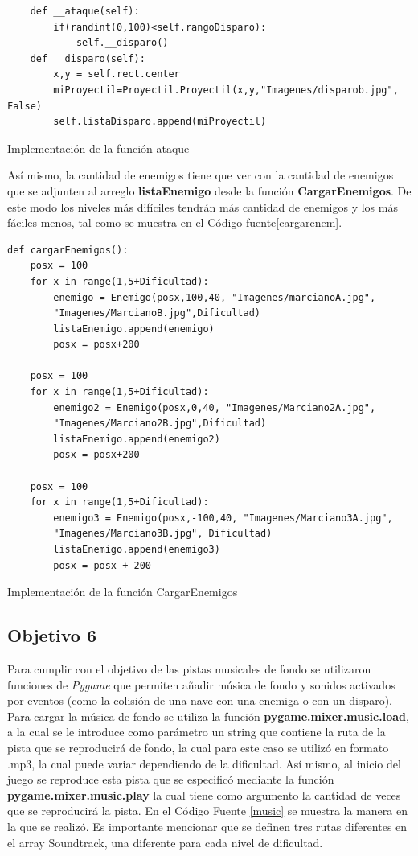 \documentclass[12pt,letterpaper]{article}
\begin{document}
\begin{listing}[H]
\begin{verbatim}
    def __ataque(self):
        if(randint(0,100)<self.rangoDisparo):
            self.__disparo()
    def __disparo(self):
        x,y = self.rect.center
        miProyectil=Proyectil.Proyectil(x,y,"Imagenes/disparob.jpg", False)
        self.listaDisparo.append(miProyectil)
\end{verbatim}
\caption{Implementación de la función ataque}
\label{ataque}
\end{listing}
Así mismo, la cantidad de enemigos tiene que ver con la cantidad de enemigos que se adjunten al arreglo \textbf{listaEnemigo} desde la función \textbf{CargarEnemigos}. De este modo los niveles más difíciles tendrán más cantidad de enemigos y los más fáciles menos, tal como se muestra en el Código fuente\ref{cargarenem}. 


        
    \begin{listing}[H]
\begin{verbatim}
def cargarEnemigos(): 
    posx = 100
    for x in range(1,5+Dificultad):
        enemigo = Enemigo(posx,100,40, "Imagenes/marcianoA.jpg",
        "Imagenes/MarcianoB.jpg",Dificultad)
        listaEnemigo.append(enemigo)
        posx = posx+200
    
    posx = 100
    for x in range(1,5+Dificultad):
        enemigo2 = Enemigo(posx,0,40, "Imagenes/Marciano2A.jpg",
        "Imagenes/Marciano2B.jpg",Dificultad)
        listaEnemigo.append(enemigo2)
        posx = posx+200

    posx = 100
    for x in range(1,5+Dificultad):
        enemigo3 = Enemigo(posx,-100,40, "Imagenes/Marciano3A.jpg",
        "Imagenes/Marciano3B.jpg", Dificultad)
        listaEnemigo.append(enemigo3)
        posx = posx + 200
\end{verbatim}
\caption{Implementación de la función CargarEnemigos}
\label{cargarenem}
\end{listing}
\subsection{Objetivo 6} \label{objetivo6}
Para cumplir con el objetivo de las pistas musicales de fondo se utilizaron funciones de \textit{Pygame} que permiten añadir música de fondo y sonidos activados por eventos (como la colisión de una nave con una enemiga o con un disparo). Para cargar la música de fondo se utiliza la función \textbf{pygame.mixer.music.load}, a la cual se le introduce como parámetro un string que contiene la ruta de la pista que se reproducirá de fondo, la cual para este caso se utilizó en formato .mp3, la cual puede variar dependiendo de la dificultad. Así mismo, al inicio del juego se reproduce esta pista que se especificó mediante la función \textbf{pygame.mixer.music.play} la cual tiene como argumento la cantidad de veces que se reproducirá la pista. En el Código Fuente \ref{music} se muestra la manera en la que se realizó. Es importante mencionar que se definen tres rutas diferentes en el array Soundtrack, una diferente para cada nivel de dificultad.
\end{document}

